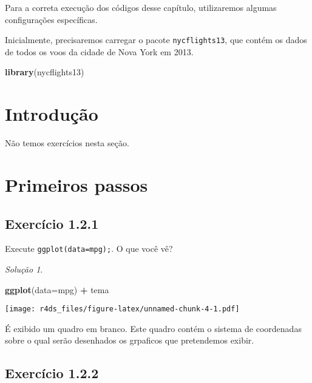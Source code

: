 \documentclass[
]{book}
\newenvironment{Shaded}{\begin{snugshade}}{\end{snugshade}}
\newcommand{\AttributeTok}[1]{\textcolor[rgb]{0.13,0.29,0.53}{#1}}
\newcommand{\FunctionTok}[1]{\textcolor[rgb]{0.13,0.29,0.53}{\textbf{#1}}}
\newcommand{\NormalTok}[1]{#1}
\newcommand{\SpecialCharTok}[1]{\textcolor[rgb]{0.81,0.36,0.00}{\textbf{#1}}}
\theoremstyle{definition}
\theoremstyle{definition}
\theoremstyle{definition}
\theoremstyle{definition}
\theoremstyle{remark}
\newtheorem*{solution}{Solução}
\begin{document}
Para a correta execução dos códigos desse capítulo, utilizaremos algumas configurações específicas.

Inicialmente, precisaremos carregar o pacote \texttt{nycflights13}, que contém os dados de todos os voos da cidade de Nova York em 2013.

\begin{Shaded}
\begin{Highlighting}[]
\FunctionTok{library}\NormalTok{(nycflights13)}
\end{Highlighting}
\end{Shaded}

\hypertarget{introduuxe7uxe3o-1}{%
\section{Introdução}\label{introduuxe7uxe3o-1}}

Não temos exercícios nesta seção.

\hypertarget{primeiros-passos}{%
\section{Primeiros passos}\label{primeiros-passos}}

\hypertarget{exr1-2-1}{%
\subsection*{Exercício 1.2.1}\label{exr1-2-1}}

Execute \texttt{ggplot(data=mpg);}. O que você vê?

\begin{solution}
\leavevmode

\begin{Shaded}
\begin{Highlighting}[]
\FunctionTok{ggplot}\NormalTok{(}\AttributeTok{data=}\NormalTok{mpg) }\SpecialCharTok{+}
\NormalTok{    tema}
\end{Highlighting}
\end{Shaded}

\texttt{[image: r4ds\_files/figure-latex/unnamed-chunk-4-1.pdf]}

É exibido um quadro em branco. Este quadro contém o sistema de coordenadas sobre o qual serão desenhados os grpaficos que pretendemos exibir.

\end{solution}

\hypertarget{exr1-2-2}{%
\subsection*{Exercício 1.2.2}\label{exr1-2-2}}
\end{document}

